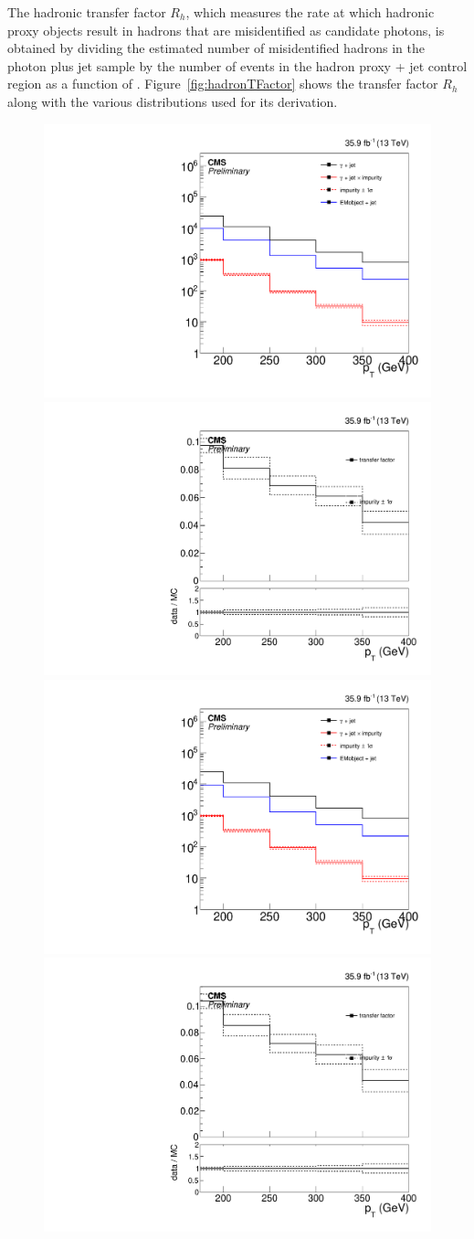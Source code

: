 The hadronic transfer factor $R_{h}$, which measures the rate at which hadronic proxy objects result in hadrons that are misidentified as candidate photons, is obtained by dividing the estimated number of misidentified hadrons in the photon plus jet sample by the number of events in the hadron proxy + jet control region as a function of \pt. 
Figure~\ref{fig:hadronTFactor} shows the transfer factor $R_{h}$ along with the various distributions used for its derivation.

\begin{figure}[htbp]
  \begin{center}
    \includegraphics[width=0.45\linewidth]{Analysis/Figures/hfake/distributionsNom.pdf}
    \includegraphics[width=0.45\linewidth]{Analysis/Figures/hfake/tfactorNom.pdf}
    \includegraphics[width=0.45\linewidth]{Analysis/Figures/hfake/distributionsTight.pdf}
    \includegraphics[width=0.45\linewidth]{Analysis/Figures/hfake/tfactorTight.pdf}

\end{center}
\end{figure}
